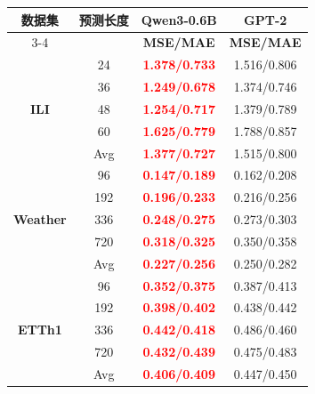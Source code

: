 \begin{table}[H]
\centering
\scriptsize
\setlength{\tabcolsep}{3.2pt}
\renewcommand{\arraystretch}{0.96}
\setlength{\aboverulesep}{0.3ex}
\setlength{\belowrulesep}{0.3ex}
\label{tab:chap3-qwen-gpt2}
\begin{tabular}{c|c|c|c}
\toprule
\multirow{2}{*}{\textbf{数据集}} &
\multirow{2}{*}{\textbf{预测长度}} &
\textbf{Qwen3-0.6B} &
\textbf{GPT-2} \\
\cmidrule(lr){3-4}
& & \textbf{MSE/MAE} & \textbf{MSE/MAE} \\
\midrule
\multirow{5}{*}{\textbf{ILI}}
& 24 & \textbf{\textcolor{red}{1.378/0.733}} & 1.516/0.806 \\
& 36 & \textbf{\textcolor{red}{1.249/0.678}} & 1.374/0.746 \\
& 48 & \textbf{\textcolor{red}{1.254/0.717}} & 1.379/0.789 \\
& 60 & \textbf{\textcolor{red}{1.625/0.779}} & 1.788/0.857 \\
& Avg & \textbf{\textcolor{red}{1.377/0.727}} & 1.515/0.800 \\
\midrule
\multirow{5}{*}{\textbf{Weather}}
& 96 & \textbf{\textcolor{red}{0.147/0.189}} & 0.162/0.208 \\
& 192 & \textbf{\textcolor{red}{0.196/0.233}} & 0.216/0.256 \\
& 336 & \textbf{\textcolor{red}{0.248/0.275}} & 0.273/0.303 \\
& 720 & \textbf{\textcolor{red}{0.318/0.325}} & 0.350/0.358 \\
& Avg & \textbf{\textcolor{red}{0.227/0.256}} & 0.250/0.282 \\
\midrule
\multirow{5}{*}{\textbf{ETTh1}}
& 96 & \textbf{\textcolor{red}{0.352/0.375}} & 0.387/0.413 \\
& 192 & \textbf{\textcolor{red}{0.398/0.402}} & 0.438/0.442 \\
& 336 & \textbf{\textcolor{red}{0.442/0.418}} & 0.486/0.460 \\
& 720 & \textbf{\textcolor{red}{0.432/0.439}} & 0.475/0.483 \\
& Avg & \textbf{\textcolor{red}{0.406/0.409}} & 0.447/0.450 \\
\bottomrule
\end{tabular}
\end{table}

